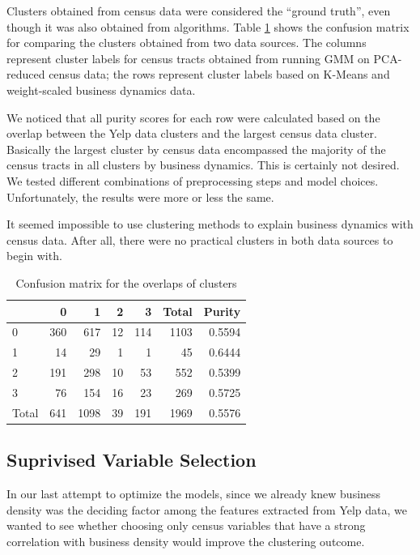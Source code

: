 \documentclass[compsoc]{IEEEtran}
\let\MYoriglatexcaption\caption
\renewcommand{\caption}[2][\relax]{\MYoriglatexcaption[#2]{#2}}
\begin{document}
Clusters obtained from census data were considered the ``ground truth'', even though it was also obtained from algorithms. Table \ref{confusion-1} shows the confusion matrix for comparing the clusters obtained from two data sources. The columns represent cluster labels for census tracts obtained from running GMM on PCA-reduced census data; the rows represent cluster labels based on K-Means and weight-scaled business dynamics data.

We noticed that all purity scores for each row were calculated based on the overlap between the Yelp data clusters and the largest census data cluster. Basically the largest cluster by census data encompassed the majority of the census tracts in all clusters by business dynamics. This is certainly not desired. We tested different combinations of preprocessing steps and model choices. Unfortunately, the results were more or less the same.

It seemed impossible to use clustering methods to explain business dynamics with census data. After all, there were no practical clusters in both data sources to begin with.

\begin{table}[h]
\centering
\caption{Confusion matrix for the overlaps of clusters}
\label{confusion-1}
\bgroup
\def\arraystretch{1.5}
\begin{tabular}{lrrrr|r|r}
\toprule
{} &    0 &     1 &   2 &    3 &  Total &  Purity \\
\hline
0     &  360 &   617 &  12 &  114 &   1103 &  0.5594 \\
1     &   14 &    29 &   1 &    1 &     45 &  0.6444 \\
2     &  191 &   298 &  10 &   53 &    552 &  0.5399 \\
3     &   76 &   154 &  16 &   23 &    269 &  0.5725 \\
\hline
Total &  641 &  1098 &  39 &  191 &   1969 &  0.5576 \\
\bottomrule
\end{tabular}
\egroup
\end{table}

\subsection{Suprivised Variable Selection}

In our last attempt to optimize the models, since we already knew business density was the deciding factor among the features extracted from Yelp data, we wanted to see whether choosing only  census variables that have a strong correlation with business density would improve the clustering outcome.
\end{document}
